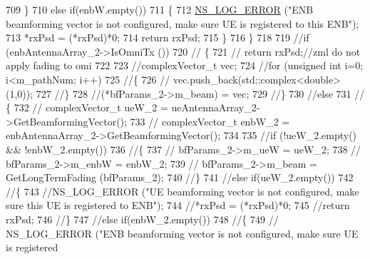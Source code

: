\begin{DoxyCode}
709                 \}
710                 \textcolor{keywordflow}{else} \textcolor{keywordflow}{if}(enbW.empty())
711                 \{
712                         \hyperlink{group__logging_ga0261a8db1d4ac5f79417d117634fd455}{NS\_LOG\_ERROR} (\textcolor{stringliteral}{"ENB beamforming vector is not configured, make sure UE
       is registered to this ENB"});
713                         *rxPsd = (*rxPsd)*0;
714                         \textcolor{keywordflow}{return} rxPsd;
715                 \}
716         \}
718 
719         \textcolor{comment}{//if (enbAntennaArray\_2->IsOmniTx ())}
720 \textcolor{comment}{//      \{}
721 \textcolor{comment}{//              return rxPsd;//zml do not apply fading to omi}
722 
723                 \textcolor{comment}{//complexVector\_t vec;}
724                 \textcolor{comment}{//for (unsigned int i=0; i<m\_pathNum; i++)}
725                 \textcolor{comment}{//\{}
726                 \textcolor{comment}{//      vec.push\_back(std::complex<double> (1,0));}
727                 \textcolor{comment}{//\}}
728                 \textcolor{comment}{//(*bfParams\_2->m\_beam) = vec;}
729         \textcolor{comment}{//\}}
730         \textcolor{comment}{//else}
731 \textcolor{comment}{//      \{}
732         \textcolor{comment}{//      complexVector\_t ueW\_2 = ueAntennaArray\_2->GetBeamformingVector();}
733         \textcolor{comment}{//      complexVector\_t enbW\_2 = enbAntennaArray\_2->GetBeamformingVector();}
734 
735                 \textcolor{comment}{//if (!ueW\_2.empty() && !enbW\_2.empty())}
736                 \textcolor{comment}{//\{}
737                 \textcolor{comment}{//      bfParams\_2->m\_ueW = ueW\_2;}
738                 \textcolor{comment}{//      bfParams\_2->m\_enbW = enbW\_2;}
739                 \textcolor{comment}{//      bfParams\_2->m\_beam = GetLongTermFading (bfParams\_2);}
740                 \textcolor{comment}{//\}}
741                 \textcolor{comment}{//else if(ueW\_2.empty())}
742                 \textcolor{comment}{//\{}
743                         \textcolor{comment}{//NS\_LOG\_ERROR ("UE beamforming vector is not configured, make sure this UE is
       registered to ENB");}
744                         \textcolor{comment}{//*rxPsd = (*rxPsd)*0;}
745                         \textcolor{comment}{//return rxPsd;}
746                 \textcolor{comment}{//\}}
747                 \textcolor{comment}{//else if(enbW\_2.empty())}
748                 \textcolor{comment}{//\{}
749                 \textcolor{comment}{//      NS\_LOG\_ERROR ("ENB beamforming vector is not configured, make sure UE is registered
}
\end{DoxyCode}
